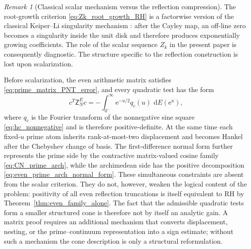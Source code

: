 \documentclass[11pt]{amsart}
\numberwithin{equation}{section}
\theoremstyle{plain}
\theoremstyle{definition}
\theoremstyle{remark}
\newtheorem{remark}[theorem]{Remark}
\newcommand{\RH}{\mathrm{RH}}
\newcommand{\e}{\mathrm e}
\newcommand{\dd}{\,\mathrm d}
\begin{document}
\begin{remark}[Classical scalar mechanism versus the reflection compression]
\label{rem:scalar_classical_matrix_distinction}
The root-growth criterion \eqref{eq:Zk_root_growth_RH} is a factorwise version of the classical Keiper--Li singularity mechanism \cite{Keiper1992,Li1997,BombieriLagarias1999}: after the Cayley map, an off-line zero becomes a singularity inside the unit disk and therefore produces exponentially growing coefficients.  The role of the scalar sequence $Z_k$ in the present paper is consequently diagnostic.  The structure specific to the reflection construction is lost upon scalarization.

Before scalarization, the even arithmetic matrix satisfies \eqref{eq:prime_matrix_PNT_error}, and every quadratic test has the form
\begin{equation}
 c^T\mathsf Z_N^Ec
 =-\int_{0^-}^\infty \e^{-u/2}q_c(u)\,\dd E(\e^u),
\end{equation}
where $q_c$ is the Fourier transform of the nonnegative sine square \eqref{eq:hc_nonnegative} and is therefore positive-definite.  At the same time each fixed-$u$ prime atom inherits rank-at-most-two displacement and becomes Hankel after the Chebyshev change of basis.  The first-difference normal form further represents the prime side by the contractive matrix-valued cosine family \eqref{eq:CN_prime_arch}, while the archimedean side has the positive decomposition \eqref{eq:even_prime_arch_normal_form}.  These simultaneous constraints are absent from the scalar criterion.  They do not, however, weaken the logical content of the problem: positivity of all even reflection truncations is itself equivalent to $\RH$ by Theorem~\ref{thm:even_family_alone}.  The fact that the admissible quadratic tests form a smaller structured cone is therefore not by itself an analytic gain.  A matrix proof requires an additional mechanism that converts displacement, nesting, or the prime--continuum representation into a sign estimate; without such a mechanism the cone description is only a structural reformulation.
\end{remark}
\end{document}

